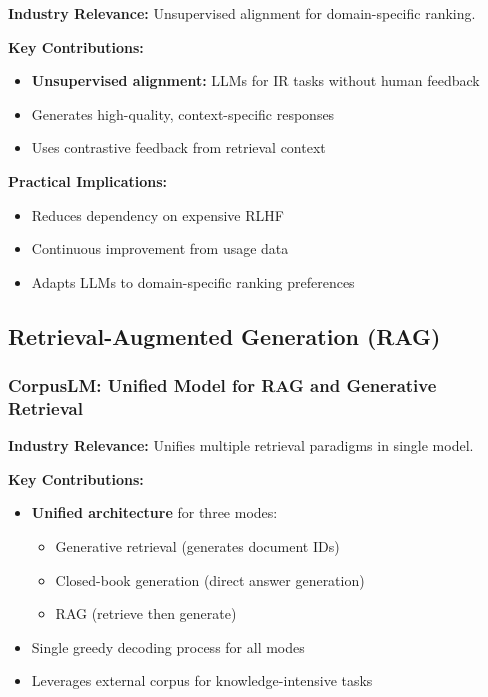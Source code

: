 \documentclass[11pt,letterpaper]{article}
\begin{document}
\textbf{Industry Relevance:} Unsupervised alignment for domain-specific ranking.

\textbf{Key Contributions:}
\begin{itemize}[leftmargin=*]
    \item \textbf{Unsupervised alignment:} LLMs for IR tasks without human feedback
    \item Generates high-quality, context-specific responses
    \item Uses contrastive feedback from retrieval context
\end{itemize}

\textbf{Practical Implications:}
\begin{itemize}[leftmargin=*]
    \item Reduces dependency on expensive RLHF
    \item Continuous improvement from usage data
    \item Adapts LLMs to domain-specific ranking preferences
\end{itemize}

\subsection{Retrieval-Augmented Generation (RAG)}

\subsubsection{CorpusLM: Unified Model for RAG and Generative Retrieval}

\textbf{Industry Relevance:} Unifies multiple retrieval paradigms in single model.

\textbf{Key Contributions:}
\begin{itemize}[leftmargin=*]
    \item \textbf{Unified architecture} for three modes:
    \begin{itemize}
        \item Generative retrieval (generates document IDs)
        \item Closed-book generation (direct answer generation)
        \item RAG (retrieve then generate)
    \end{itemize}
    \item Single greedy decoding process for all modes
    \item Leverages external corpus for knowledge-intensive tasks
\end{itemize}
\end{document}
